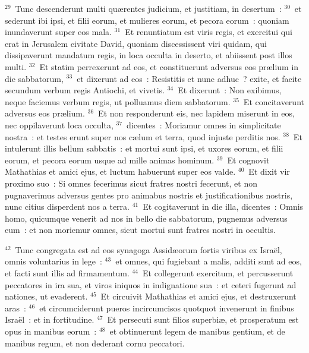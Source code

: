 ${}^{29}$~Tunc descenderunt multi qu\ae rentes judicium, et justitiam, in desertum~:
${}^{30}$~et sederunt ibi ipsi, et filii eorum, et mulieres eorum, et pecora eorum~: quoniam inundaverunt super eos mala.
${}^{31}$~Et renuntiatum est viris regis, et exercitui qui erat in Jerusalem civitate David, quoniam discessissent viri quidam, qui dissipaverunt mandatum regis, in loca occulta in deserto, et abiissent post illos multi.
${}^{32}$~Et statim perrexerunt ad eos, et constituerunt adversus eos pr\ae lium in die sabbatorum,
${}^{33}$~et dixerunt ad eos~: Resistitis et nunc adhuc~? exite, et facite secundum verbum regis Antiochi, et vivetis.
${}^{34}$~Et dixerunt~: Non exibimus, neque faciemus verbum regis, ut polluamus diem sabbatorum.
${}^{35}$~Et concitaverunt adversus eos pr\ae lium.
${}^{36}$~Et non responderunt eis, nec lapidem miserunt in eos, nec oppilaverunt loca occulta,
${}^{37}$~dicentes~: Moriamur omnes in simplicitate nostra~: et testes erunt super nos c\ae lum et terra, quod injuste perditis nos.
${}^{38}$~Et intulerunt illis bellum sabbatis~: et mortui sunt ipsi, et uxores eorum, et filii eorum, et pecora eorum usque ad mille animas hominum.
${}^{39}$~Et cognovit Mathathias et amici ejus, et luctum habuerunt super eos valde.
${}^{40}$~Et dixit vir proximo suo~: Si omnes fecerimus sicut fratres nostri fecerunt, et non pugnaverimus adversus gentes pro animabus nostris et justificationibus nostris, nunc citius disperdent nos a terra.
${}^{41}$~Et cogitaverunt in die illa, dicentes~: Omnis homo, quicumque venerit ad nos in bello die sabbatorum, pugnemus adversus eum~: et non moriemur omnes, sicut mortui sunt fratres nostri in occultis.


${}^{42}$~Tunc congregata est ad eos synagoga Assid\ae orum fortis viribus ex Isra\"el, omnis voluntarius in lege~:
${}^{43}$~et omnes, qui fugiebant a malis, additi sunt ad eos, et facti sunt illis ad firmamentum.
${}^{44}$~Et collegerunt exercitum, et percusserunt peccatores in ira sua, et viros iniquos in indignatione sua~: et ceteri fugerunt ad nationes, ut evaderent.
${}^{45}$~Et circuivit Mathathias et amici ejus, et destruxerunt aras~:
${}^{46}$~et circumciderunt pueros incircumcisos quotquot invenerunt in finibus Isra\"el~: et in fortitudine.
${}^{47}$~Et persecuti sunt filios superbi\ae , et prosperatum est opus in manibus eorum~:
${}^{48}$~et obtinuerunt legem de manibus gentium, et de manibus regum, et non dederant cornu peccatori.


